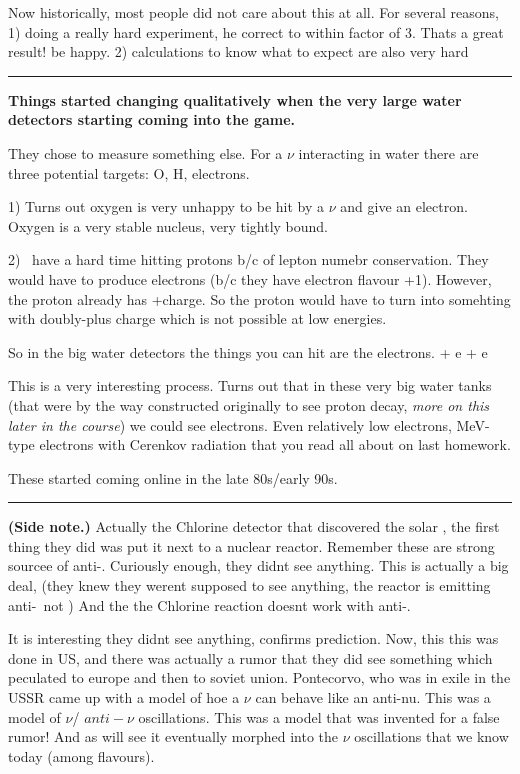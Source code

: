 {Now historically, most people did not care about this at all.
For several reasons, 
1) doing a really hard experiment, he correct to within factor of 3. Thats a great result! be happy. 
2) calculations to know what to expect are also very hard 

\noindent\rule{\textwidth}{1pt}

\textbf{Things started changing qualitatively when the very large water detectors starting coming into the game. }

They chose to measure something else.
For a $\nu$ interacting in water there are three potential targets:  O, H, electrons.

1) Turns out oxygen is very unhappy to be hit by a $\nu$ and give an electron. 
Oxygen is a very stable nucleus, very tightly bound.

2) \nus\ have a hard time hitting protons b/c of lepton numebr conservation. 
They would have to produce electrons (b/c they have electron flavour +1). 
However, the proton already has +charge.  
So the proton would have to turn into somehting with doubly-plus charge which is not possible at low energies. 

So in the big water detectors the things you can hit are the electrons. 
\be
\nu + e \rightarrow \nu + e
\ee

This is a very interesting process.
Turns out that in these very big water tanks (that were by the way constructed originally to see proton decay, \textit{more on this later in the course}) we could see electrons.
Even relatively low electrons, MeV-type electrons with Cerenkov radiation that you read all about on last homework.

These started coming online in the late 80s/early 90s.

\noindent\rule{\textwidth}{1pt}

\textbf{(Side note.)}
Actually the Chlorine detector that discovered the solar \nus, the first thing they did was put it next to a nuclear reactor.
Remember these are strong sourcee of anti-\nus.
Curiously enough, they didnt see anything.
This is actually a big deal, (they knew they werent supposed to see anything, the reactor is emitting anti-\nus\ not \nus) 
And the the Chlorine reaction doesnt work with anti-\nus. 

It is interesting they didnt see anything, confirms prediction. 
Now, this this was done in US, and there was actually a rumor that they did see something which peculated to europe and then to soviet union. 
Pontecorvo, who was in exile in the USSR came up with a model of hoe a $\nu$ can behave like an anti-nu.
This was a model of $\nu$/ $anti-\nu$ oscillations. 
This was a model that was invented for a false rumor! 
And as will see it eventually morphed into the $\nu$ oscillations that we know today (among flavours). 

}
